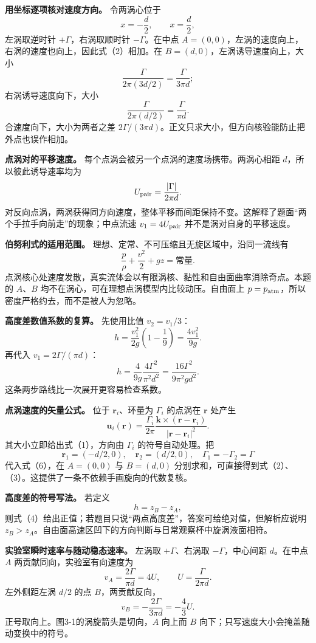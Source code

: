 \documentclass[12pt,a4paper,UTF8]{ctexart}
\begin{document}
\textbf{用坐标逐项核对速度方向。} 令两涡心位于 \[
x=-\frac d2,\qquad x=\frac d2,
\] 左涡取逆时针 \(+\Gamma\)，右涡取顺时针 \(-\Gamma\)。在中点
\(A=(0,0)\)，左涡的速度向上，右涡的速度也向上，因此式（2）相加。在
\(B=(d,0)\)，左涡诱导速度向上，大小 \[
\frac{\Gamma}{2\pi(3d/2)}
=\frac{\Gamma}{3\pi d};
\] 右涡诱导速度向下，大小 \[
\frac{\Gamma}{2\pi(d/2)}
=\frac{\Gamma}{\pi d}.
\] 合速度向下，大小为两者之差
\(2\Gamma/(3\pi d)\)。正文只求大小，但方向核验能防止把外点也误作相加。

\textbf{点涡对的平移速度。}
每个点涡会被另一个点涡的速度场携带。两涡心相距
\(d\)，所以彼此诱导速率均为 \[
U_{\rm pair}=\frac{|\Gamma|}{2\pi d}.
\]
对反向点涡，两涡获得同方向速度，整体平移而间距保持不变。这解释了题面``两个手拉手向前走''的现象；中点流速
\(v_1=4U_{\rm pair}\) 并不是涡对自身的平移速度。

\textbf{伯努利式的适用范围。}
理想、定常、不可压缩且无旋区域中，沿同一流线有 \[
\frac p\rho+\frac{v^2}{2}+gz=\text{常量}.
\]
点涡核心处速度发散，真实流体会以有限涡核、黏性和自由面曲率消除奇点。本题的
\(A\)、\(B\) 均不在涡心，可在理想点涡模型内比较动压。自由面上
\(p=p_{\rm atm}\)，所以密度严格约去，而不是被人为忽略。

\textbf{高度差数值系数的复算。} 先使用比值 \(v_2=v_1/3\)： \[
h=\frac{v_1^2}{2g}\left(1-\frac19\right)
=\frac{4v_1^2}{9g}.
\] 再代入 \(v_1=2\Gamma/(\pi d)\)： \[
h=\frac4{9g}\frac{4\Gamma^2}{\pi^2d^2}
=\frac{16\Gamma^2}{9\pi^2gd^2}.
\] 这条两步路线比一次展开更容易检查系数。

\textbf{点涡速度的矢量公式。} 位于 \(\bm r_i\)、环量为 \(\Gamma_i\)
的点涡在 \(\bm r\) 处产生 \[
\bm u_i(\bm r)
=\frac{\Gamma_i}{2\pi}
\frac{\bm k\times(\bm r-\bm r_i)}
{|\bm r-\bm r_i|^2}. \tag{6}
\] 其大小立即给出式（1），方向由 \(\Gamma_i\) 的符号自动处理。把 \[
\bm r_1=(-d/2,0),\quad
\bm r_2=(d/2,0),\quad
\Gamma_1=-\Gamma_2=\Gamma
\] 代入式（6），在 \(A=(0,0)\) 与 \(B=(d,0)\)
分别求和，可直接得到式（2）、（3）。这提供了一条不依赖手画旋向的代数复核。

\textbf{高度差的符号写法。} 若定义 \[
h=z_B-z_A,
\]
则式（4）给出正值；若题目只说``两点高度差''，答案可给绝对值，但解析应说明
\(z_B>z_A\)。自由面高速区凹下的方向判断与日常观察杯中旋涡液面相符。

\textbf{实验室瞬时速率与随动稳态速率。} 左涡取 \(+\Gamma\)、右涡取
\(-\Gamma\)，中心间距 \(d\)。在中点 \(A\) 两贡献同向，实验室有向速度为
\[
v_A=\frac{2\Gamma}{\pi d}=4U,
\qquad U=\frac\Gamma{2\pi d}.
\] 左外侧距左涡 \(d/2\) 的点 \(B\)，两贡献反向， \[
v_B=-\frac{2\Gamma}{3\pi d}=-\frac43U.
\] 正号取向上。图3-1的涡旋箭头是切向，\(A\) 向上而 \(B\)
向下；只写速度大小会掩盖随动变换中的符号。
\end{document}

